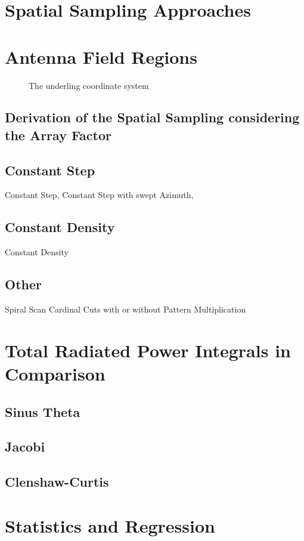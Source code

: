 \section{Spatial Sampling Approaches}


\section{Antenna Field Regions}
\begin{figure}[H]
\centering
\def\svgwidth{0.6\textwidth}

\caption{The underling coordinate system}
\label{coordinates}
\end{figure}

\subsection{Derivation of the Spatial Sampling considering the Array Factor}

\subsection{Constant Step}
Constant Step, Constant Step with swept Azimuth,

\subsection{Constant Density}

Constant Density

\subsection{Other}

Spiral Scan
Cardinal Cuts with or without Pattern Multiplication

\section{Total Radiated Power Integrals in Comparison}

\subsection{Sinus Theta}

\subsection{Jacobi}

\subsection{Clenshaw-Curtis}

\section{Statistics and Regression}